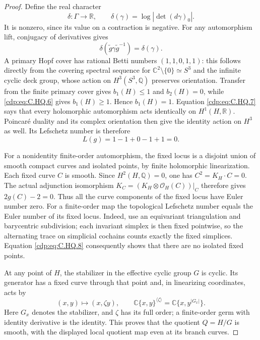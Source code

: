 \begin{proof}
Define the real character
\[
 \delta:\Gamma\longrightarrow\mathbb R,
 \qquad \delta(\gamma)=\log|\det(d\gamma)_0|.
 \tag{C.HQ.6}\label{cdp:eq:C.HQ.6}
\]
It is nonzero, since its value on a contraction
is negative. For any automorphism lift,
conjugacy of derivatives gives
\[
 \delta(\widetilde g\gamma\widetilde g^{-1})
                         =\delta(\gamma).
 \tag{C.HQ.7}\label{cdp:eq:C.HQ.7}
\]
A primary Hopf cover has rational Betti numbers
$(1,1,0,1,1)$: this follows directly from the
covering spectral sequence for
$\mathbb C^2\setminus\{0\}\simeq S^3$ and the
infinite cyclic deck group, whose action on
$H^3(S^3,\mathbb Q)$ preserves orientation.
Transfer from the finite primary cover gives
$b_1(H)\le1$ and $b_2(H)=0$, while \eqref{cdp:eq:C.HQ.6}
gives $b_1(H)\ge1$. Hence $b_1(H)=1$.
Equation \eqref{cdp:eq:C.HQ.7} says that every holomorphic
automorphism acts identically on $H^1(H,\mathbb R)$.
Poincar\'e duality and its complex orientation
then give the identity action on $H^3$ as well.
Its Lefschetz number is therefore
\[
                 L(g)=1-1+0-1+1=0.
 \tag{C.HQ.8}\label{cdp:eq:C.HQ.8}
\]

For a nonidentity finite-order automorphism,
the fixed locus is a disjoint union of smooth
compact curves and isolated points, by finite
holomorphic linearization. Each fixed curve $C$
is smooth. Since $H^2(H,\mathbb Q)=0$, one has
$C^2=K_H\cdot C=0$. The actual adjunction
isomorphism $K_C=(K_H\otimes\mathcal O_H(C))|_C$
therefore gives $2g(C)-2=0$. Thus all the
curve components of the fixed locus have Euler
number zero. For a finite-order
map the topological Lefschetz number equals
the Euler number of its fixed locus. Indeed,
use an equivariant triangulation and barycentric
subdivision; each invariant simplex is then
fixed pointwise, so the alternating trace
on simplicial cochains counts exactly the
fixed simplices. Equation \eqref{cdp:eq:C.HQ.8} consequently
shows that there are no isolated fixed points.

At any point of $H$, the stabilizer in the
effective cyclic group $G$ is cyclic. Its
generator has a fixed curve through that
point and, in linearizing coordinates, acts
by
\[
                (x,y)\longmapsto(x,\zeta y),
 \qquad
 \mathbb C\{x,y\}^{\langle\zeta\rangle}
                    =\mathbb C\{x,y^{|G_x|}\}.
 \tag{C.HQ.9}\label{cdp:eq:C.HQ.9}
\]
Here $G_x$ denotes the stabilizer, and
$\zeta$ has its full order; a finite-order
germ with identity derivative is the identity.
This proves that the quotient $Q=H/G$ is
smooth, with the displayed local quotient
map even at its branch curves.


\end{proof}
